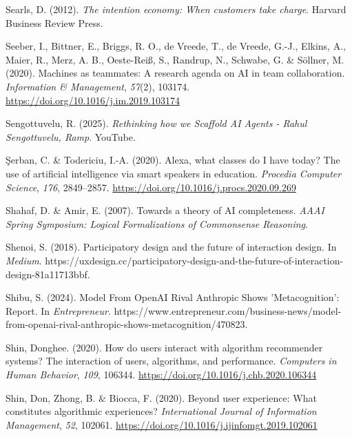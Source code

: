 \documentclass[
  letterpaper,
  DIV=11,
  numbers=noendperiod]{scrartcl}
\newlength{\cslhangindent}
\newenvironment{CSLReferences}[2] %
 {\begin{list}{}{%
  \setlength{\itemindent}{0pt}
  \setlength{\leftmargin}{0pt}
  \setlength{\parsep}{0pt}
  \ifodd #1
   \setlength{\leftmargin}{\cslhangindent}
   \setlength{\itemindent}{-1\cslhangindent}
  \fi
  \setlength{\itemsep}{#2\baselineskip}}}
 {\end{list}}
\begin{document}
\begin{CSLReferences}{1}{0}
Searls, D. (2012). \emph{The intention economy: When customers take
charge}. Harvard Business Review Press.

Seeber, I., Bittner, E., Briggs, R. O., de Vreede, T., de Vreede, G.-J.,
Elkins, A., Maier, R., Merz, A. B., Oeste-Reiß, S., Randrup, N.,
Schwabe, G. \& Söllner, M. (2020). Machines as teammates: {A} research
agenda on {AI} in team collaboration. \emph{Information \& Management},
\emph{57}(2), 103174. \url{https://doi.org/10.1016/j.im.2019.103174}

Sengottuvelu, R. (2025). \emph{Rethinking how we {Scaffold AI Agents} -
{Rahul Sengottuvelu}, {Ramp}}. YouTube.

Şerban, C. \& Todericiu, I.-A. (2020). Alexa, what classes do {I} have
today? {The} use of artificial intelligence via smart speakers in
education. \emph{Procedia Computer Science}, \emph{176}, 2849--2857.
\url{https://doi.org/10.1016/j.procs.2020.09.269}

Shahaf, D. \& Amir, E. (2007). Towards a theory of {AI} completeness.
\emph{{AAAI} Spring Symposium: {Logical} Formalizations of Commonsense
Reasoning}.

Shenoi, S. (2018). Participatory design and the future of interaction
design. In \emph{Medium}.
https://uxdesign.cc/participatory-design-and-the-future-of-interaction-design-81a11713bbf.

Shibu, S. (2024). Model {From OpenAI Rival Anthropic Shows}
'{Metacognition}': {Report}. In \emph{Entrepreneur}.
https://www.entrepreneur.com/business-news/model-from-openai-rival-anthropic-shows-metacognition/470823.

Shin, Donghee. (2020). How do users interact with algorithm recommender
systems? {The} interaction of users, algorithms, and performance.
\emph{Computers in Human Behavior}, \emph{109}, 106344.
\url{https://doi.org/10.1016/j.chb.2020.106344}

Shin, Don, Zhong, B. \& Biocca, F. (2020). Beyond user experience:
{What} constitutes algorithmic experiences? \emph{International Journal
of Information Management}, \emph{52}, 102061.
\url{https://doi.org/10.1016/j.ijinfomgt.2019.102061}


\end{CSLReferences}
\end{document}
